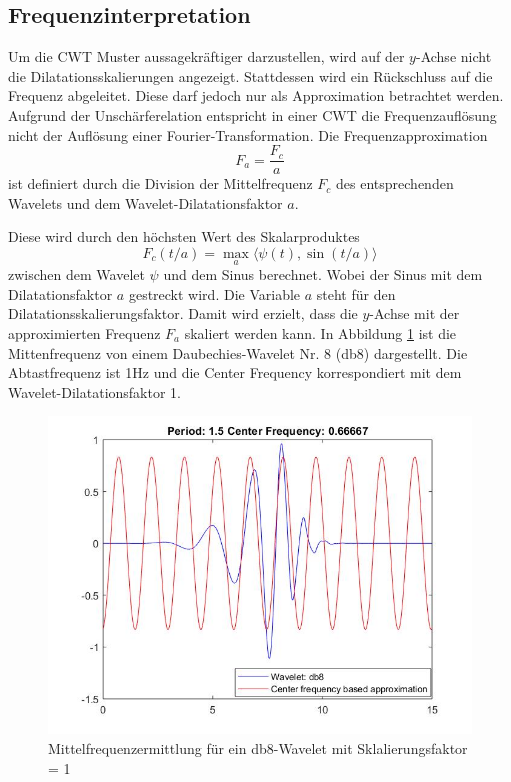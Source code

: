 \begin{refsection}
\subsection{Frequenzinterpretation}
Um die CWT Muster aussagekräftiger darzustellen, wird auf der $y$-Achse nicht die Dilatationsskalierungen angezeigt. 
Stattdessen wird ein Rückschluss auf die Frequenz abgeleitet. 
Diese darf jedoch nur als Approximation betrachtet werden.
Aufgrund der Unschärferelation entspricht in einer CWT die Frequenzauflösung nicht der Auflösung einer Fourier-Transformation. 
Die Frequenzapproximation 
\begin{equation}
F_a=\dfrac{F_c}{a}
\end{equation}
ist definiert durch die Division der Mittelfrequenz $F_c$ des entsprechenden Wavelets und dem Wavelet-Dilatationsfaktor $a$.
%

Diese wird durch den höchsten Wert des Skalarproduktes 
\begin{equation}
F_c(t/a) = \max_a\langle \psi(t),\sin (t/a)\rangle
\end{equation}
zwischen dem Wavelet $\psi$ und dem Sinus berechnet.
Wobei der Sinus mit dem Dilatationsfaktor $a$ gestreckt wird.
Die Variable $a$ steht für den Dilatationsskalierungsfaktor. 
Damit wird erzielt, dass die $y$-Achse mit der approximierten Frequenz $F_a$ skaliert werden kann.
In Abbildung \ref{fig:Mittenfrequ} ist die Mittenfrequenz von einem Daubechies-Wavelet Nr. 8 (db8) dargestellt.
Die Abtastfrequenz ist 1Hz und die Center Frequency korrespondiert mit dem Wavelet-Dilatationsfaktor 1.   

\begin{figure}
	\centering
	\includegraphics [width=0.7\linewidth] {papers/gis/Bilder/Mittenfrequenz}
	\caption{Mittelfrequenzermittlung für ein db8-Wavelet mit Sklalierungsfaktor = 1}
	\label{fig:Mittenfrequ}
\end{figure}



\end{refsection}
